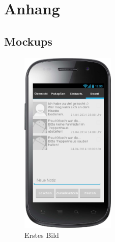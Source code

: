 \chapter{Anhang}
\section{Mockups}
\begin{figure}[htbp] 
  \centering
     \includegraphics[width=0.4\textwidth]{anhang/mockups/blackboard.png}
  \caption{Erstes Bild}
  \label{fig:Bild1}
\end{figure}


